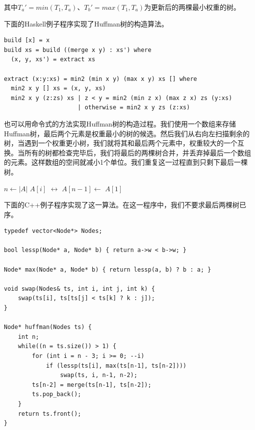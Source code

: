 \documentclass[b5paper]{ctexart}
\begin{document}
其中$T_a' = min(T_1, T_a)$、$T_b' = max(T_1, T_a)$为更新后的两棵最小权重的树。

下面的Haskell例子程序实现了Huffman树的构造算法。

\lstset{language=Haskell}
\begin{lstlisting}[style=Haskell]
build [x] = x
build xs = build ((merge x y) : xs') where
  (x, y, xs') = extract xs

extract (x:y:xs) = min2 (min x y) (max x y) xs [] where
  min2 x y [] xs = (x, y, xs)
  min2 x y (z:zs) xs | z < y = min2 (min z x) (max z x) zs (y:xs)
                     | otherwise = min2 x y zs (z:xs)
\end{lstlisting}

也可以用命令式的方法实现Huffman树的构造过程。我们使用一个数组来存储Huffman树，最后两个元素是权重最小的树的候选。然后我们从右向左扫描剩余的树，当遇到一个权重更小树，我们就将其和最后两个元素中，权重较大的一个互换。当所有的树都检查完毕后，我们将最后的两棵树合并，并丢弃掉最后一个数组的元素。这样数组的空间就减小1个单位。我们重复这一过程直到只剩下最后一棵树。

\begin{algorithmic}[1]
    \State $n \gets |A|$
        \State {} $A[i]$ $\leftrightarrow$ 
      \EndIf
    \EndFor
    \State $A[n-1] \gets$ 
    \State {}
  \EndWhile
  \State \Return $A[1]$
\EndFunction
\end{algorithmic}

下面的C++例子程序实现了这一算法。在这一程序中，我们不要求最后两棵树已序。

\lstset{language=C++}
\begin{lstlisting}
typedef vector<Node*> Nodes;

bool lessp(Node* a, Node* b) { return a->w < b->w; }

Node* max(Node* a, Node* b) { return lessp(a, b) ? b : a; }

void swap(Nodes& ts, int i, int j, int k) {
    swap(ts[i], ts[ts[j] < ts[k] ? k : j]);
}

Node* huffman(Nodes ts) {
    int n;
    while((n = ts.size()) > 1) {
        for (int i = n - 3; i >= 0; --i)
            if (lessp(ts[i], max(ts[n-1], ts[n-2])))
                swap(ts, i, n-1, n-2);
        ts[n-2] = merge(ts[n-1], ts[n-2]);
        ts.pop_back();
    }
    return ts.front();
}
\end{lstlisting}
\end{document}
